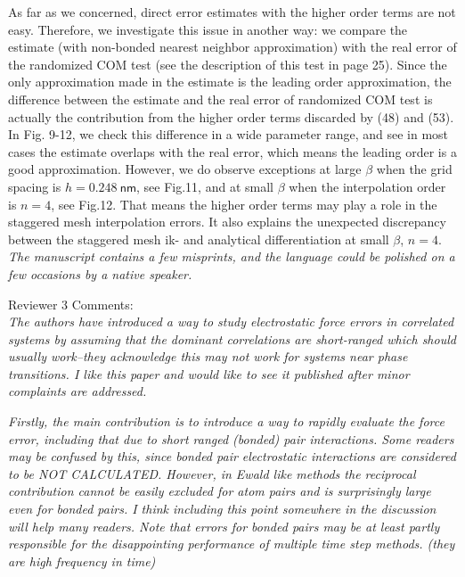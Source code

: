 \documentclass[a4paper]{article}
\begin{document}
As far as we concerned,
direct error estimates with the higher order terms are not easy.
Therefore, we investigate this issue in another way:
we compare the estimate (with non-bonded nearest neighbor
approximation) with the real error of the randomized COM test
(see the description of this test in page 25).
Since the only approximation made in the estimate is the leading order
approximation, the difference between the estimate and the real error
of randomized COM test is actually the contribution from the higher
order terms discarded by (48) and (53).
In Fig. 9-12,
we check this difference in a wide parameter range, and see in most
cases the estimate overlaps with the real error, which means
the leading order is a good approximation. 
However,
we do observe exceptions
at large $\beta$ when the grid spacing is $h=0.248\:\textsf{nm}$,
see Fig.11, and
at small $\beta$ when the interpolation order is $n=4$,
see Fig.12.
That means the higher order terms may play a role in the staggered
mesh interpolation errors. It also explains the unexpected discrepancy
between the staggered mesh ik- and analytical differentiation
at small $\beta$, $n=4$.
\\





\textit{ The manuscript contains a few misprints, and the language
  could be polished on a few occasions by a native speaker.  }


\vskip 1cm
\noindent
Reviewer 3 Comments:\\

\textit{
The authors have introduced a way to study electrostatic force errors
in correlated systems by assuming that the dominant correlations are
short-ranged which should usually work--they acknowledge this may not
work for systems near phase transitions. I like this paper and would
like to see it published after minor complaints are addressed.
}

\textit{
Firstly, the main contribution is to introduce a way to rapidly
evaluate the force error, including that due to short ranged (bonded)
pair interactions. Some readers may be confused by this, since bonded
pair electrostatic interactions are considered to be NOT
CALCULATED. However, in Ewald like methods the reciprocal contribution
cannot be easily excluded for atom pairs and is surprisingly large
even for bonded pairs. I think including this point somewhere in the
discussion will help many readers. Note that errors for bonded pairs
may be at least partly responsible for the disappointing performance
of multiple time step methods. (they are high frequency in time)
}
\end{document}
